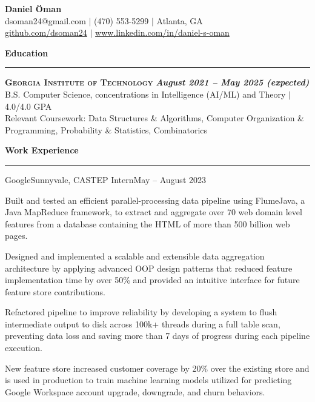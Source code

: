 \documentclass{article}
\newcommand{\horizontal}{\vspace{2pt}\hrule}
\newcommand{\school}[3]{\vspace{2pt}\textsc{\textbf{#1}} \hfill \textbf{\textit{#2}} \\ #3}
\newcommand{\sectitle}[1]{\vspace{3pt} \textbf{\large #1} \horizontal}
\begin{document}
\thispagestyle{empty}
\begin{center}
    \textbf{\LARGE Daniel Öman} \\
    dsoman24@gmail.com $|$ (470) 553-5299 $|$ Atlanta, GA \\
    \href{https://github.com/dsoman24}{github.com/dsoman24} $|$ \href{https://www.linkedin.com/in/daniel-s-oman/}{www.linkedin.com/in/daniel-s-oman}
\end{center}

\begin{flushleft}
\sectitle{Education}

\school{Georgia Institute of Technology}{August 2021 -- May 2025 (expected)}
{B.S. Computer Science, concentrations in Intelligence (AI/ML) and Theory $|$ 4.0/4.0 GPA \\ Relevant Coursework: Data Structures \& Algorithms, Computer Organization \& Programming, Probability \& Statistics, Combinatorics}

\sectitle{Work Experience}

    \begin{experience}{Google}{Sunnyvale, CA}{STEP Intern}{May -- August 2023}
        \item Built and tested an efficient parallel-processing data pipeline using FlumeJava, a Java MapReduce framework, to extract and aggregate over 70 web domain level features from a database containing the HTML of more than 500 billion web pages.
        \item Designed and implemented a scalable and extensible data aggregation architecture by applying advanced OOP design patterns that reduced feature implementation time by over 50\% and provided an intuitive interface for future feature store contributions.
        \item Refactored pipeline to improve reliability by developing a system to flush intermediate output to disk across 100k+ threads during a full table scan, preventing data loss and saving more than 7 days of progress during each pipeline execution.
        \item New feature store increased customer coverage by 20\% over the existing store and is used in production to train machine learning models utilized for predicting Google Workspace account upgrade, downgrade, and churn behaviors.
    \end{experience}


\end{flushleft}
\end{document}
